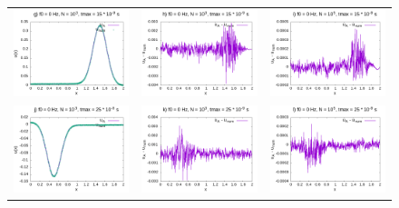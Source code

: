\documentclass[11pt,a4paper]{report}
\begin{document}
\begin{figure}
\begin{tabular}{ccc}
\includegraphics[width=55mm]{plots/0/mc0_3_15} &   \includegraphics[width=55mm]{plots/0/mc0_3_15_dif} &   \includegraphics[width=55mm]{plots/0/mc0_5_15_dif} \\
\includegraphics[width=55mm]{plots/0/mc0_3_25} &   \includegraphics[width=55mm]{plots/0/mc0_3_25_dif} &   \includegraphics[width=55mm]{plots/0/mc0_5_25_dif} \\

\end{tabular}
\end{figure}
\end{document}
